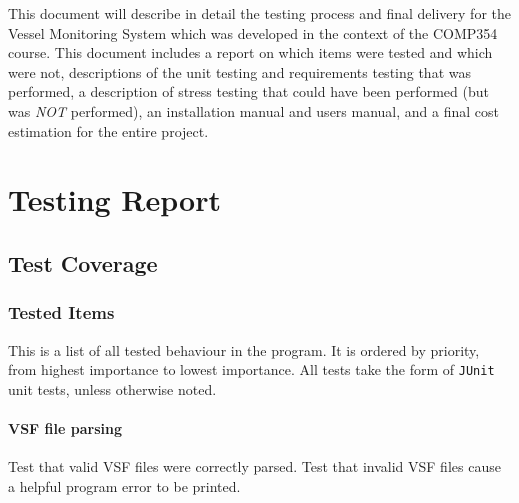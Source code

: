 \documentclass{article}
\begin{document}

This document will describe in detail the testing process and final delivery for the Vessel Monitoring System which was developed in the context of the COMP354 course. This document includes a report on which items were tested and which were not, descriptions of the unit testing and requirements testing that was performed, a description of stress testing that could have been performed (but was \emph{NOT} performed), an installation manual and users manual, and a final cost estimation for the entire project.

\break

{\color{royalbluedark}\section{Testing Report}}


{\color{royalblue}\subsection{Test Coverage}}

\subsubsection{Tested Items} %


This is a list of all tested behaviour in the program. It is ordered by priority, from highest importance to lowest importance. All tests take the form of \verb|JUnit| unit tests, unless otherwise noted.

\paragraph{VSF file parsing \\}
Test that valid VSF files were correctly parsed. Test that invalid VSF files cause a helpful program error to be printed.
\end{document}
